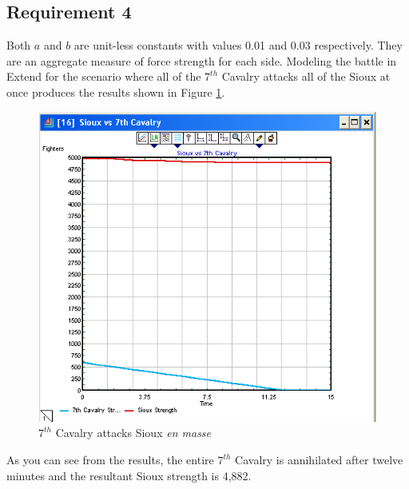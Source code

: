 \documentclass[letterpaper,10pt]{article}
\begin{document}
\subsection{Requirement 4}
Both $a$ and $b$ are unit-less constants with values 0.01 and 0.03 respectively.  They are an aggregate measure of force strength for each side.  Modeling the battle in Extend for the scenario where all of the $7^{th}$ Cavalry attacks all of the Sioux at once produces the results shown in Figure \ref{fig4a}.

\begin{figure}[h!tp]
\begin{center}
\includegraphics[scale=0.4]{fig4a.png}
\caption{$7^{th}$ Cavalry attacks Sioux \emph{en masse}}
\label{fig4a}
\end{center}
\end{figure}

As you can see from the results, the entire $7^{th}$ Cavalry is annihilated after twelve minutes and the resultant Sioux strength is 4,882.
\end{document}
